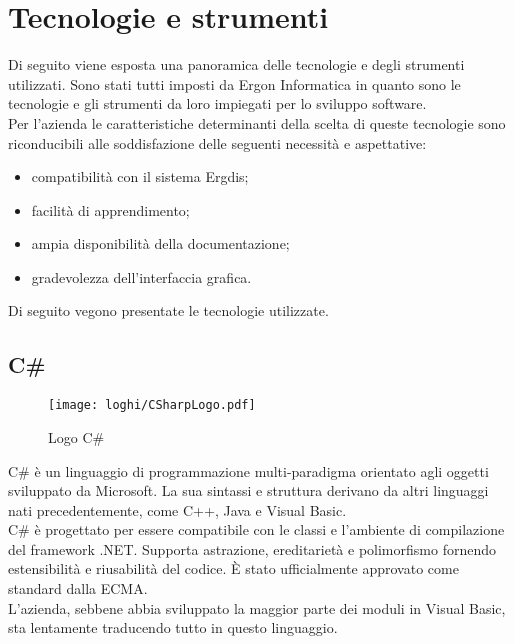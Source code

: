 \section{Tecnologie e strumenti}
\label{sec:tecnologie-strumenti}

\noindent Di seguito viene esposta una panoramica delle tecnologie e degli strumenti utilizzati.
Sono stati tutti imposti da Ergon Informatica in quanto sono le tecnologie e gli strumenti
da loro impiegati per lo sviluppo software.\\
Per l’azienda le caratteristiche determinanti della scelta di queste tecnologie
sono riconducibili alle soddisfazione delle seguenti necessità e aspettative:
\begin{itemize}
    \item compatibilità con il sistema Ergdis;
    \item facilità di apprendimento;
    \item ampia disponibilità della documentazione;
    \item gradevolezza dell’interfaccia grafica.
\end{itemize}
Di seguito vegono presentate le tecnologie utilizzate.


\subsection*{C\#}
\begin{figure}[!h] 
    \centering 
    \texttt{[image: loghi/CSharpLogo.pdf]} 
    \caption{Logo C\#}
 \end{figure}
\noindent C\# è un linguaggio di programmazione multi-paradigma orientato agli oggetti
sviluppato da Microsoft. La sua sintassi e struttura derivano da altri linguaggi nati
precedentemente, come C++, Java e Visual Basic.\\
C\# è progettato per essere compatibile con le classi e l’ambiente di compilazione
del framework .NET. Supporta astrazione, ereditarietà e polimorfismo
fornendo estensibilità e riusabilità del codice.
È stato ufficialmente approvato come standard dalla ECMA.\\
L'azienda, sebbene abbia sviluppato la maggior parte dei moduli
in Visual Basic, sta lentamente traducendo tutto in questo linguaggio.

